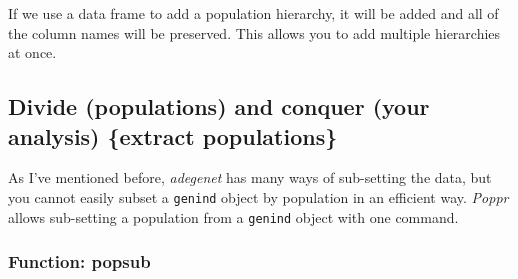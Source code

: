\documentclass[letterpaper]{article}\usepackage[]{graphicx}\usepackage[]{color}
\newcommand{\tab}{\hspace*{1em}}
\newcommand{\Poppr}{\textit{Poppr}}
\newcommand{\adegenet}{\textit{adegenet}}
\begin{document}
\noindent
If we use a data frame to add a population hierarchy, it will be added and all
of the column names will be preserved. This allows you to add multiple hierarchies
at once.
%
\subsection{Divide (populations) and conquer (your analysis) \{extract populations\}}
\label{data.manip:divide}

\tab\tab As I've mentioned before, \adegenet{} has many ways of sub-setting the data, but you cannot easily subset a \texttt{genind} object by population in an efficient way. \Poppr{} allows sub-setting a population from a \texttt{genind} object with one command.
\subsubsection{Function: popsub}
\label{data.manip:divide:popsub}
\end{document}
